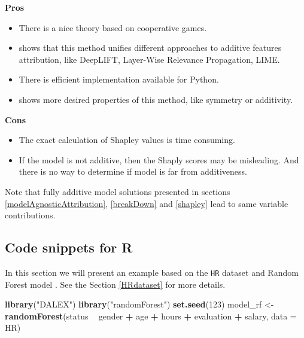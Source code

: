 \documentclass[12pt,]{krantz}
\newenvironment{Shaded}{\begin{snugshade}}{\end{snugshade}}
\newcommand{\DataTypeTok}[1]{\textcolor[rgb]{0.13,0.29,0.53}{#1}}
\newcommand{\DecValTok}[1]{\textcolor[rgb]{0.00,0.00,0.81}{#1}}
\newcommand{\KeywordTok}[1]{\textcolor[rgb]{0.13,0.29,0.53}{\textbf{#1}}}
\newcommand{\NormalTok}[1]{#1}
\newcommand{\OperatorTok}[1]{\textcolor[rgb]{0.81,0.36,0.00}{\textbf{#1}}}
\newcommand{\StringTok}[1]{\textcolor[rgb]{0.31,0.60,0.02}{#1}}
\providecommand{\tightlist}{%
  \setlength{\itemsep}{0pt}\setlength{\parskip}{0pt}}
\theoremstyle{definition}
\theoremstyle{definition}
\theoremstyle{definition}
\theoremstyle{remark}
\begin{document}
\textbf{Pros}

\begin{itemize}
\tightlist
\item
  There is a nice theory based on cooperative games.
\item
  \citep{SHAP} shows that this method unifies different approaches to
  additive features attribution, like DeepLIFT, Layer-Wise Relevance
  Propagation, LIME.
\item
  There is efficient implementation available for Python.
\item
  \citep{SHAP} shows more desired properties of this method, like
  symmetry or additivity.
\end{itemize}

\textbf{Cons}

\begin{itemize}
\tightlist
\item
  The exact calculation of Shapley values is time consuming.
\item
  If the model is not additive, then the Shaply scores may be
  misleading. And there is no way to determine if model is far from
  additiveness.
\end{itemize}

Note that fully additive model solutions presented in sections
\ref{modelAgnosticAttribution}, \ref{breakDown} and \ref{shapley} lead
to same variable contributions.

\hypertarget{code-snippets-for-r-6}{%
\subsection{Code snippets for R}\label{code-snippets-for-r-6}}

In this section we will present an example based on the \texttt{HR}
dataset and Random Forest model \citep{R-randomForest}. See the Section
\ref{HRdataset} for more details.

\begin{Shaded}
\begin{Highlighting}[]
\KeywordTok{library}\NormalTok{(}\StringTok{"DALEX"}\NormalTok{)}
\KeywordTok{library}\NormalTok{(}\StringTok{"randomForest"}\NormalTok{)}
\KeywordTok{set.seed}\NormalTok{(}\DecValTok{123}\NormalTok{)}
\NormalTok{model_rf <-}\StringTok{ }\KeywordTok{randomForest}\NormalTok{(status }\OperatorTok{~}\StringTok{ }\NormalTok{gender }\OperatorTok{+}\StringTok{ }\NormalTok{age }\OperatorTok{+}\StringTok{ }\NormalTok{hours }\OperatorTok{+}\StringTok{ }\NormalTok{evaluation }\OperatorTok{+}\StringTok{ }\NormalTok{salary, }\DataTypeTok{data =}\NormalTok{ HR)}
\end{Highlighting}
\end{Shaded}
\end{document}

